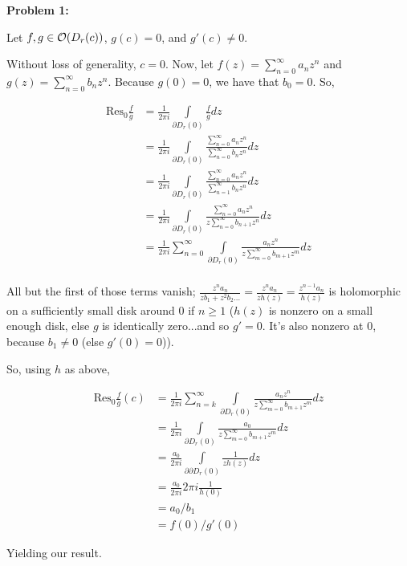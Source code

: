 \documentclass[a4paper,12pt]{article}
\begin{document}
{\bf Problem 1:}

Let $f, g \in \mathcal{O}(D_r(c))$, $g(c) = 0$, and $g'(c) \neq 0$. 

Without loss of generality, $c = 0$. Now, let $f(z) = \sum\limits_{n=0}^\infty a_nz^n$ and $g(z) = \sum\limits_{n=0}^\infty b_nz^n$. Because $g(0) = 0$, we have that $b_0 = 0$. So,

\begin{align*}
\text{Res}_0 \frac{f}{g} &= \frac{1}{2\pi i} \int\limits_{ \partial D_r(0)} \frac{f}{g} dz\\
&= \frac{1}{2\pi i} \int\limits_{ \partial D_r(0)} \frac{\sum\limits_{n=0}^\infty a_nz^n}{\sum\limits_{n=0}^\infty b_nz^n} dz\\
&= \frac{1}{2\pi i} \int\limits_{ \partial D_r(0)} \frac{\sum\limits_{n=0}^\infty a_nz^n}{\sum\limits_{n=1}^\infty b_nz^n} dz\\
&= \frac{1}{2\pi i} \int\limits_{ \partial D_r(0)} \frac{\sum\limits_{n=0}^\infty a_nz^n}{z\sum\limits_{n=0}^\infty b_{n+1}z^n} dz\\
&= \frac{1}{2\pi i} \sum\limits_{n=0}^\infty \int\limits_{ \partial D_r(0)} \frac{a_nz^n}{z\sum\limits_{m=0}^\infty b_{m+1}z^m} dz\\
\end{align*} 

All but the first of those terms vanish; $\frac{z^na_n}{zb_1 + z^2b_2 \ldots } = \frac{z^na_n}{zh(z)} = \frac{z^{n-1}a_n}{h(z)}$ is holomorphic on a sufficiently small disk around $0$ if $n \geq 1$ ($h(z)$ is nonzero on a small enough disk, else $g$ is identically zero...and so $g' = 0$. It's also nonzero at $0$, because $b_1 \neq 0$ (else $g'(0) = 0$)).

So, using $h$ as above,

\begin{align*}
\text{Res}_0 \frac{f}{g} (c) &= \frac{1}{2\pi i} \sum\limits_{n=k}^\infty \int\limits_{ \partial D_r(0)} \frac{a_nz^n}{z\sum\limits_{m=0}^\infty b_{m+1}z^m} dz\\
&= \frac{1}{2\pi i}  \int\limits_{ \partial D_r(0)} \frac{a_0}{z\sum\limits_{m=0}^\infty b_{m+1}z^m} dz\\
&= \frac{a_0}{2\pi i}  \int\limits_{ \partial  \partial D_r(0)} \frac{1}{zh(z)} dz\\
&= \frac{a_0}{2\pi i}  2\pi i \frac{1}{h(0)}\\
&= a_0/b_1\\
&= f(0)/g'(0)
\end{align*}

Yielding our result. 
\end{document}
